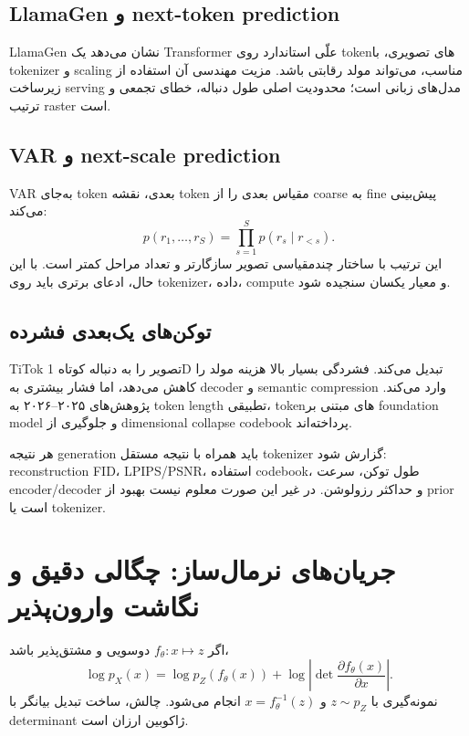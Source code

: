 \documentclass[12pt,openany,oneside]{book}
\begin{document}
\subsection{LlamaGen و next-token prediction}
LlamaGen نشان می‌دهد یک Transformer علّی استاندارد روی tokenهای تصویری، با tokenizer و scaling مناسب، می‌تواند مولد رقابتی باشد. مزیت مهندسی آن
استفاده از زیرساخت serving مدل‌های زبانی است؛ محدودیت اصلی طول دنباله، خطای تجمعی و ترتیب raster است.

\subsection{VAR و next-scale prediction}
VAR به‌جای token بعدی، نقشه token مقیاس بعدی را از coarse به fine پیش‌بینی می‌کند:
\begin{equation}
 p(r_1,\ldots,r_S)=\prod_{s=1}^S p(r_s\mid r_{<s}).
\end{equation}
این ترتیب با ساختار چندمقیاسی تصویر سازگارتر و تعداد مراحل کمتر است. با این حال، ادعای برتری باید روی tokenizer، داده، compute و معیار یکسان سنجیده شود.

\subsection{توکن‌های یک‌بعدی فشرده}
TiTok تصویر را به دنباله کوتاه 1D تبدیل می‌کند. فشردگی بسیار بالا هزینه مولد را کاهش می‌دهد، اما فشار بیشتری به decoder و semantic compression وارد می‌کند.
پژوهش‌های ۲۰۲۵--۲۰۲۶ به token length تطبیقی، tokenهای مبتنی بر foundation model و جلوگیری از dimensional collapse codebook پرداخته‌اند.

\begin{keybox}
هر نتیجه generation باید همراه با نتیجه مستقل tokenizer گزارش شود: reconstruction FID، LPIPS/PSNR، استفاده codebook، طول توکن، سرعت encoder/decoder و
حداکثر رزولوشن. در غیر این صورت معلوم نیست بهبود از prior است یا tokenizer.
\end{keybox}

\section{جریان‌های نرمال‌ساز: چگالی دقیق و نگاشت وارون‌پذیر}
اگر $f_\theta:x\mapsto z$ دوسویی و مشتق‌پذیر باشد،
\begin{equation}
 \log p_X(x)=\log p_Z(f_\theta(x))+
 \log\left|\det\frac{\partial f_\theta(x)}{\partial x}\right|.
 \label{eq:change-vars}
\end{equation}
نمونه‌گیری با $z\sim p_Z$ و $x=f_\theta^{-1}(z)$ انجام می‌شود. چالش، ساخت تبدیل بیانگر با determinant ژاکوبین ارزان است.
\end{document}
